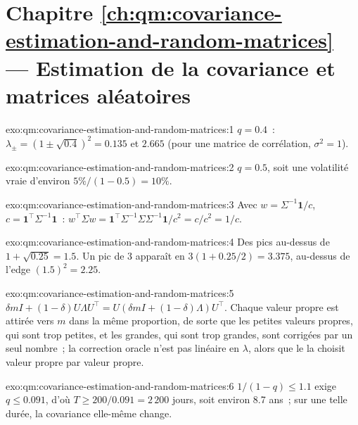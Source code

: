 \section*{Chapitre \ref{ch:qm:covariance-estimation-and-random-matrices} --- Estimation de la covariance et matrices aléatoires}

\begin{solution}{exo:qm:covariance-estimation-and-random-matrices:1}
$q = 0.4$~: $\lambda_\pm = (1 \pm \sqrt{0.4})^2 = 0.135$ et $2.665$ (pour une matrice de corrélation, $\sigma^2 = 1$).
\end{solution}

\begin{solution}{exo:qm:covariance-estimation-and-random-matrices:2}
$q = 0.5$, soit une volatilité vraie d'environ $5\%/(1 - 0.5) = 10\%$.
\end{solution}

\begin{solution}{exo:qm:covariance-estimation-and-random-matrices:3}
Avec $w = \Sigma^{-1}\mathbf 1/c$, $c = \mathbf 1^\top\Sigma^{-1}\mathbf 1$~: $w^\top\Sigma w = \mathbf 1^\top\Sigma^{-1}\Sigma\Sigma^{-1}\mathbf 1/c^2 = c/c^2 = 1/c$.
\end{solution}

\begin{solution}{exo:qm:covariance-estimation-and-random-matrices:4}
Des pics au-dessus de $1 + \sqrt{0.25} = 1.5$. Un pic de 3 apparaît en $3(1 + 0.25/2) = 3.375$, au-dessus de l'edge $(1.5)^2 = 2.25$.
\end{solution}

\begin{solution}{exo:qm:covariance-estimation-and-random-matrices:5}
$\delta mI + (1 - \delta)U\Lambda U^\top = U(\delta mI + (1 - \delta)\Lambda)U^\top$. Chaque valeur propre est attirée vers $m$ dans la même proportion, de sorte que les petites valeurs propres, qui sont trop petites,
et les grandes, qui sont trop grandes, sont corrigées par un seul nombre~; la correction oracle n'est pas linéaire en $\lambda$, alors que le  la choisit valeur propre par valeur propre.
\end{solution}

\begin{solution}{exo:qm:covariance-estimation-and-random-matrices:6}
$1/(1 - q) \le 1.1$ exige $q \le 0.091$, d'où $T \ge 200/0.091 = 2\,200$ jours, soit environ 8.7 ans~; sur une telle durée, la covariance elle-même change.
\end{solution}

